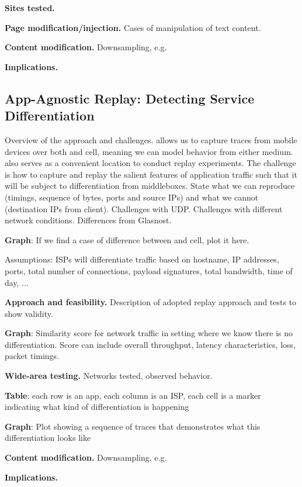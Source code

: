\noindent\textbf{Sites tested.}

\noindent\textbf{Page modification/injection.} Cases of manipulation of text content.

\noindent\textbf{Content modification.} Downsampling, e.g.

\noindent\textbf{Implications.} 


\subsection{App-Agnostic Replay: Detecting Service Differentiation}

Overview of the approach and challenges. \meddle allows us to capture 
traces from mobile devices over both \wifi and cell, meaning we can model 
behavior from either medium. \meddle also serves as a convenient location 
to conduct replay experiments. The challenge is how to capture and replay 
the salient features of application traffic such that it will be subject to differentiation 
from middleboxes. State what we can reproduce (timings, sequence of bytes, ports and source IPs) 
and what we cannot (destination IPs from client). Challenges with UDP. Challenges 
with different network conditions. Differences from Glasnost.

\textbf{Graph}: If we find a case of difference between \wifi and cell, plot it here.

Assumptions: ISPs will differentiate traffic based on hostname, IP addresses, ports, total number of 
connections, payload signatures, total bandwidth, time of day, ... 

\noindent\textbf{Approach and feasibility.}
Description of adopted replay approach and tests to show validity.

\textbf{Graph}: Similarity score for network traffic in setting where we know there is no differentiation. 
Score can include overall throughput, latency characteristics, loss, packet timings.

\noindent\textbf{Wide-area testing.} Networks tested, observed behavior.

\textbf{Table}: each row is an app, each column is an ISP, each cell is a marker indicating what kind of 
differentiation is happening

\textbf{Graph}: Plot showing a sequence of traces that demonstrates what this differentiation looks like



\noindent\textbf{Content modification.} Downsampling, e.g.

\noindent\textbf{Implications.} 